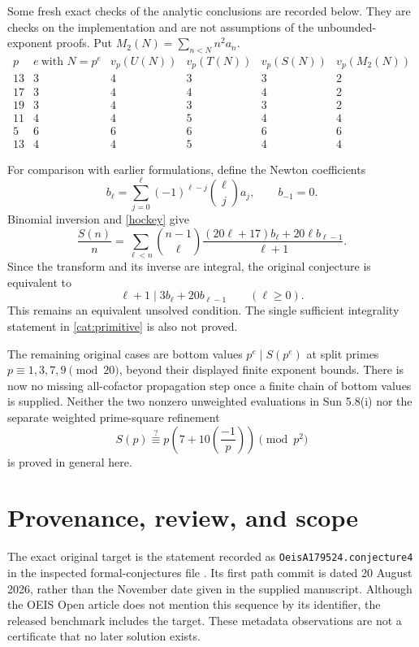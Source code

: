\documentclass[11pt,a4paper]{article}
\theoremstyle{remark}\newtheorem{remark}[theorem]{Remark}
\begin{document}
Some fresh exact checks of the analytic conclusions are recorded below.
They are checks on the implementation and are not assumptions of the
unbounded-exponent proofs. Put \(M_2(N)=\sum_{n<N}n^2a_n\).
\[
\begin{array}{c|r|rrrr}
p&e\ \text{with }N=p^e&v_p(U(N))&v_p(T(N))&v_p(S(N))&v_p(M_2(N))\\ \hline
13&3&4&3&3&2\\
17&3&4&4&4&2\\
19&3&4&3&3&2\\
11&4&4&5&4&4\\
5&6&6&6&6&6\\
13&4&4&5&4&4
\end{array}
\]

For comparison with earlier formulations, define the Newton coefficients
\[
 b_\ell=\sum_{j=0}^{\ell}(-1)^{\ell-j}\binom{\ell}{j}a_j,\qquad b_{-1}=0.
\]
Binomial inversion and \eqref{hockey} give
\[
 \frac{S(n)}n=\sum_{\ell<n}\binom{n-1}{\ell}
 \frac{(20\ell+17)b_\ell+20\ell b_{\ell-1}}{\ell+1}.
\]
Since the transform and its inverse are integral, the original conjecture
is equivalent to
\[
                 \ell+1\mid3b_\ell+20b_{\ell-1}\qquad(\ell\ge0).
\]
This remains an equivalent unsolved condition. The single sufficient
integrality statement in \eqref{cat:primitive} is also not proved.

The remaining original cases are bottom values \(p^e\mid S(p^e)\)
at split primes \(p\equiv1,3,7,9\pmod{20}\), beyond their displayed
finite exponent bounds. There is now no missing all-cofactor propagation
step once a finite chain of bottom values is supplied.
Neither the two nonzero unweighted evaluations in Sun 5.8(i) nor
the separate weighted prime-square refinement
\[
 S(p)\stackrel{?}{\equiv}
 p\left(7+10\left(\frac{-1}{p}\right)\right)\pmod{p^2}
\]
is proved in general here.

\section{Provenance, review, and scope}

The exact original target is the statement recorded as
\texttt{OeisA179524.conjecture4} in the inspected formal-conjectures file
\cite{Formal}. Its first path commit is dated 20 August 2026, rather than
the November date given in the supplied manuscript. Although the
OEIS Open article \cite{OEISOpen} does not mention this sequence by its
identifier, the released benchmark includes the target. These metadata
observations are not a certificate that no later solution exists.
\end{document}
